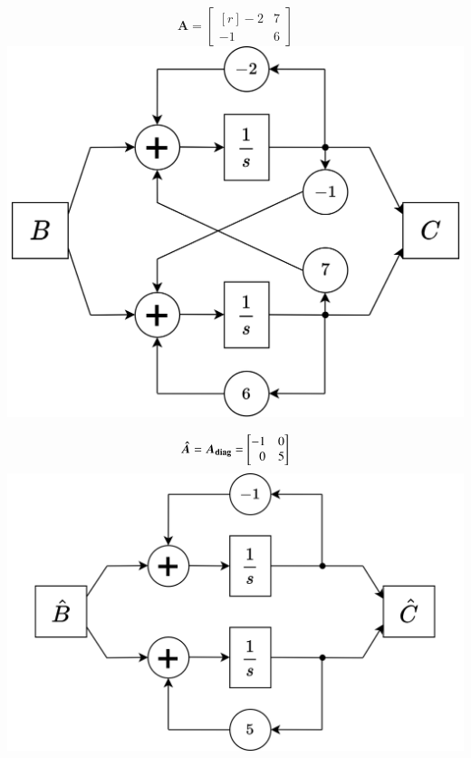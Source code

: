 \begin{minipage}[t]{0.4\columnwidth}
    \begin{center}
    \end{center}
    $$ \bm{A} = \begin{bmatrix*}[r] -2 & 7 \\ -1 & 6 \end{bmatrix*} $$
    \includegraphics[width=\columnwidth]{images/kreuzform.png}
\end{minipage}
\hfill
\begin{minipage}[t]{0.48\columnwidth}
    \begin{center}
    \end{center}
    $$ \bm{\hat{A}} = \bm{A_{\rm diag}} = \begin{bmatrix*}[r] -1 & 0 \\ 0 & 5 \end{bmatrix*} $$
    \includegraphics[width=\columnwidth]{images/parallelform.png}
\end{minipage}


